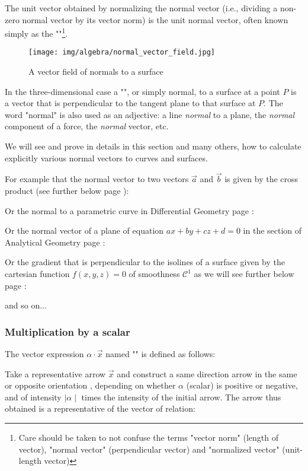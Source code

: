	The unit vector obtained by normalizing the normal vector (i.e., dividing a non-zero normal vector by its vector norm) is the unit normal vector, often known simply as the ""\footnote{Care should be taken to not confuse the terms "vector norm" (length of vector), "normal vector" (perpendicular vector) and "normalized vector" (unit-length vector)}.
	\begin{figure}[H]
		\centering
		\texttt{[image: img/algebra/normal\_vector\_field.jpg]}
		\caption{A vector field of normals to a surface}
	\end{figure}
	In the three-dimensional case a "", or simply normal, to a surface at a point $P$ is a vector that is perpendicular to the tangent plane to that surface at $P$. The word "normal" is also used as an adjective: a line \textit{normal} to a plane, the \textit{normal} component of a force, the \textit{normal} vector, etc. 
	
	We will see and prove in details in this section and many others, how to calculate explicitly various normal vectors to curves and surfaces.
	
	For example that the normal vector to two vectors $\vec{a}$ and $\vec{b}$ is given by the cross product (see further below page \pageref{cross product}):
	
	Or the normal to a parametric curve in Differential Geometry page \pageref{first Frenet formula}:
	
	Or the normal vector of a plane of equation $ax+by+cz+d=0$ in the section of Analytical Geometry page \pageref{vector normal plane}:
	
	Or the gradient that is perpendicular to the isolines of a surface given by the cartesian function $f(x,y,z)=0$ of smoothness $\mathcal{C}^1$ as we will see further below page \pageref{gradient normal}:
	
	and so on...
	
	

\pagebreak
\subsubsection{Multiplication by a scalar}
The vector expression $\alpha\cdot \vec{x}$ named "" is defined as follows:

Take a representative arrow $\vec{x}$ and construct a same direction arrow in the same or opposite orientation , depending on whether $\alpha$ (scalar) is positive or negative, and of intensity $\mid \alpha \mid$ times the intensity of the initial arrow. The arrow thus obtained is a representative of the vector of relation:
	
